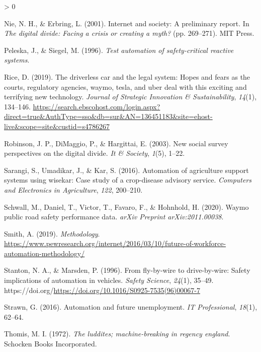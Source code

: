 \documentclass[
  english,
  man]{apa7}
\newlength{\cslhangindent}
\newenvironment{CSLReferences}[2] %
 {%
  \setlength{\parindent}{0pt}
  \ifodd #1 \everypar{\setlength{\hangindent}{\cslhangindent}}\ignorespaces\fi
  \ifnum #2 > 0
  \setlength{\parskip}{#2\baselineskip}
  \fi
 }%
 {}
\begin{document}
\begin{CSLReferences}{1}{0}
\leavevmode\hypertarget{ref-10.5555ux2f762625.762640}{}%
Nie, N. H., \& Erbring, L. (2001). Internet and society: A preliminary report. In \emph{The digital divide: Facing a crisis or creating a myth?} (pp. 269--271). MIT Press.

\leavevmode\hypertarget{ref-peleska1996test}{}%
Peleska, J., \& Siegel, M. (1996). \emph{Test automation of safety-critical reactive systems}.

\leavevmode\hypertarget{ref-13645118320190101}{}%
Rice, D. (2019). The driverless car and the legal system: Hopes and fears as the courts, regulatory agencies, waymo, tesla, and uber deal with this exciting and terrifying new technology. \emph{Journal of Strategic Innovation \& Sustainability}, \emph{14}(1), 134--146. \url{https://search.ebscohost.com/login.aspx?direct=true\&AuthType=sso\&db=sur\&AN=136451183\&site=ehost-live\&scope=site\&custid=s4786267}

\leavevmode\hypertarget{ref-robinson2003new}{}%
Robinson, J. P., DiMaggio, P., \& Hargittai, E. (2003). New social survey perspectives on the digital divide. \emph{It \& Society}, \emph{1}(5), 1--22.

\leavevmode\hypertarget{ref-sarangi2016automation}{}%
Sarangi, S., Umadikar, J., \& Kar, S. (2016). Automation of agriculture support systems using wisekar: Case study of a crop-disease advisory service. \emph{Computers and Electronics in Agriculture}, \emph{122}, 200--210.

\leavevmode\hypertarget{ref-schwall2020waymo}{}%
Schwall, M., Daniel, T., Victor, T., Favaro, F., \& Hohnhold, H. (2020). Waymo public road safety performance data. \emph{arXiv Preprint arXiv:2011.00038}.

\leavevmode\hypertarget{ref-smith_2019}{}%
Smith, A. (2019). \emph{Methodology}. \url{https://www.pewresearch.org/internet/2016/03/10/future-of-workforce-automation-methodology/}

\leavevmode\hypertarget{ref-STANTON199635}{}%
Stanton, N. A., \& Marsden, P. (1996). From fly-by-wire to drive-by-wire: Safety implications of automation in vehicles. \emph{Safety Science}, \emph{24}(1), 35--49. https://doi.org/\url{https://doi.org/10.1016/S0925-7535(96)00067-7}

\leavevmode\hypertarget{ref-strawn2016automation}{}%
Strawn, G. (2016). Automation and future unemployment. \emph{IT Professional}, \emph{18}(1), 62--64.

\leavevmode\hypertarget{ref-thomis1972luddites}{}%
Thomis, M. I. (1972). \emph{The luddites; machine-breaking in regency england}. Schocken Books Incorporated.


\end{CSLReferences}
\end{document}

